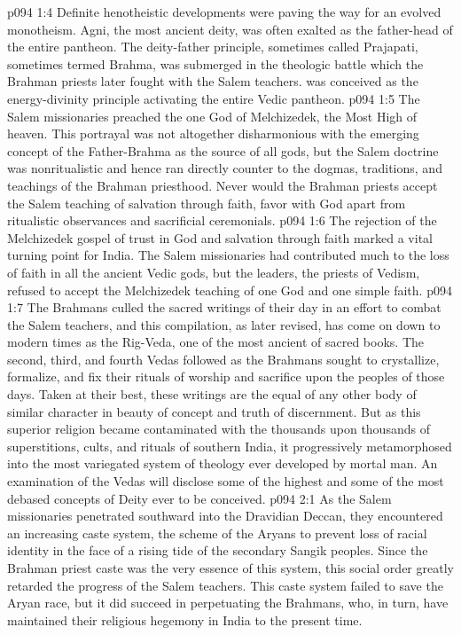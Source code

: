 \vs p094 1:4 Definite henotheistic developments were paving the way for an evolved monotheism. Agni, the most ancient deity, was often exalted as the father\hyp{}head of the entire pantheon. The deity\hyp{}father principle, sometimes called Prajapati, sometimes termed Brahma, was submerged in the theologic battle which the Brahman priests later fought with the Salem teachers.  was conceived as the energy\hyp{}divinity principle activating the entire Vedic pantheon.
\pc \vs p094 1:5 The Salem missionaries preached the one God of Melchizedek, the Most High of heaven. This portrayal was not altogether disharmonious with the emerging concept of the Father\hyp{}Brahma as the source of all gods, but the Salem doctrine was nonritualistic and hence ran directly counter to the dogmas, traditions, and teachings of the Brahman priesthood. Never would the Brahman priests accept the Salem teaching of salvation through faith, favor with God apart from ritualistic observances and sacrificial ceremonials.
\pc \vs p094 1:6 The rejection of the Melchizedek gospel of trust in God and salvation through faith marked a vital turning point for India. The Salem missionaries had contributed much to the loss of faith in all the ancient Vedic gods, but the leaders, the priests of Vedism, refused to accept the Melchizedek teaching of one God and one simple faith.
\vs p094 1:7 The Brahmans culled the sacred writings of their day in an effort to combat the Salem teachers, and this compilation, as later revised, has come on down to modern times as the Rig\hyp{}Veda, one of the most ancient of sacred books. The second, third, and fourth Vedas followed as the Brahmans sought to crystallize, formalize, and fix their rituals of worship and sacrifice upon the peoples of those days. Taken at their best, these writings are the equal of any other body of similar character in beauty of concept and truth of discernment. But as this superior religion became contaminated with the thousands upon thousands of superstitions, cults, and rituals of southern India, it progressively metamorphosed into the most variegated system of theology ever developed by mortal man. An examination of the Vedas will disclose some of the highest and some of the most debased concepts of Deity ever to be conceived.
\vs p094 2:1 As the Salem missionaries penetrated southward into the Dravidian Deccan, they encountered an increasing caste system, the scheme of the Aryans to prevent loss of racial identity in the face of a rising tide of the secondary Sangik peoples. Since the Brahman priest caste was the very essence of this system, this social order greatly retarded the progress of the Salem teachers. This caste system failed to save the Aryan race, but it did succeed in perpetuating the Brahmans, who, in turn, have maintained their religious hegemony in India to the present time.
